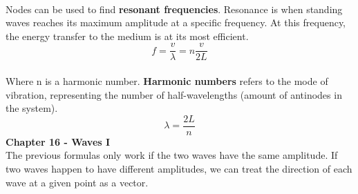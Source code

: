 \documentclass[11pt]{article}
\begin{document}
    \noindent \\ Nodes can be used to find \textbf{resonant frequencies}.
    Resonance is when standing waves reaches its maximum amplitude at a specific
    frequency.
    At this frequency, the energy transfer to the medium is at its most efficient.
    \begin{equation}
        f = \frac{v}{\lambda} = n \frac{v}{2L} \tag{Resonant frequency}
    \end{equation}
    \noindent \\ Where n is a harmonic number.
    \textbf{Harmonic numbers} refers to the mode of vibration,
    representing the number of half-wavelengths (amount of antinodes in the system).
    \begin{equation}
        \lambda = \frac{2L}{n} \tag{wavelength \lambda}
    \end{equation}
    \newpage
    \noindent \textbf{Chapter 16 - Waves I}
    \noindent \newline \\ The previous formulas only work if the two waves have the same amplitude.
    If two waves happen to have different amplitudes, we can treat the direction
    of each wave at a given point as a vector.
\end{document}
